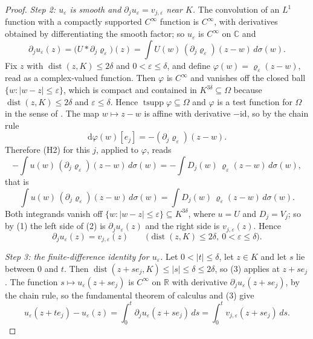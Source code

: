 \begin{proof}
\emph{Step 2: $u_\varepsilon$ is smooth and
$\partial_ju_\varepsilon=v_{j,\varepsilon}$ near $K$.}  The convolution of an
$L^{1}$ function with a compactly supported $C^\infty$ function is $C^\infty$,
with derivatives obtained by differentiating the smooth factor; so
$u_\varepsilon$ is $C^\infty$ on $\mathbb{C}$ and
\begin{equation}\tag{1}
  \partial_ju_\varepsilon(z)
  =\bigl(U*\partial_j\varrho_\varepsilon\bigr)(z)
  =\int U(w)\,(\partial_j\varrho_\varepsilon)(z-w)\,d\sigma(w).
\end{equation}
Fix $z$ with $\operatorname{dist}(z,K)\le2\delta$ and $0<\varepsilon\le\delta$,
and define $\varphi(w)=\varrho_\varepsilon(z-w)$, read as a
complex-valued function.  Then $\varphi$ is $C^\infty$ and vanishes off the
closed ball $\{w:|w-z|\le\varepsilon\}$, which is compact and contained in
$K^{3\delta}\subseteq\Omega$ because
$\operatorname{dist}(z,K)\le2\delta$ and $\varepsilon\le\delta$.  Hence
$\operatorname{tsupp}\varphi\subseteq\Omega$ and $\varphi$ is a test function
for $\Omega$ in the sense of .  The map $w\mapsto z-w$ is
affine with derivative $-\mathrm{id}$, so by the chain rule
\[
  \mathrm{d}\varphi(w)[e_j]=-(\partial_j\varrho_\varepsilon)(z-w).
\]
Therefore (H2) for this $j$, applied to $\varphi$, reads
\[
  -\int u(w)\,(\partial_j\varrho_\varepsilon)(z-w)\,d\sigma(w)
  =-\int D_j(w)\,\varrho_\varepsilon(z-w)\,d\sigma(w),
\]
that is
\begin{equation}\tag{2}
  \int u(w)\,(\partial_j\varrho_\varepsilon)(z-w)\,d\sigma(w)
  =\int D_j(w)\,\varrho_\varepsilon(z-w)\,d\sigma(w).
\end{equation}
Both integrands vanish off $\{w:|w-z|\le\varepsilon\}\subseteq K^{3\delta}$,
where $u=U$ and $D_j=V_j$; so by (1) the left side of (2) is
$\partial_ju_\varepsilon(z)$ and the right side is
$v_{j,\varepsilon}(z)$.  Hence
\begin{equation}\tag{3}
  \partial_ju_\varepsilon(z)=v_{j,\varepsilon}(z)
  \qquad\bigl(\operatorname{dist}(z,K)\le2\delta,\ 0<\varepsilon\le\delta\bigr).
\end{equation}

\emph{Step 3: the finite-difference identity for $u_\varepsilon$.}  Let
$0<|t|\le\delta$, let $z\in K$ and let $s$ lie between $0$ and $t$.  Then
$\operatorname{dist}(z+se_j,K)\le|s|\le\delta\le2\delta$, so (3) applies at
$z+se_j$.  The function $s\mapsto u_\varepsilon(z+se_j)$ is $C^\infty$ on
$\mathbb{R}$ with derivative $\partial_ju_\varepsilon(z+se_j)$, by the chain
rule, so the fundamental theorem of calculus and (3) give
\begin{equation}\tag{4}
  u_\varepsilon(z+te_j)-u_\varepsilon(z)
  =\int_0^t\partial_ju_\varepsilon(z+se_j)\,ds
  =\int_0^tv_{j,\varepsilon}(z+se_j)\,ds .
\end{equation}


\end{proof}

